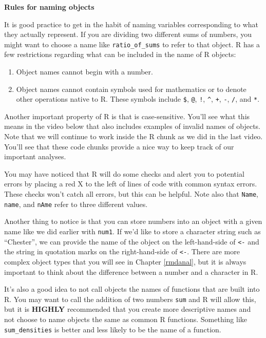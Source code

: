 \documentclass[]{tufte-book}
\providecommand{\tightlist}{%
  \setlength{\itemsep}{0pt}\setlength{\parskip}{0pt}}
\begin{document}
\vspace*{0.2in}

\noindent\textbf{Rules for naming objects}\vspace*{0.1in}

It is good practice to get in the habit of naming variables corresponding to what they actually represent. If you are dividing two different sums of numbers, you might want to choose a name like \texttt{ratio\_of\_sums} to refer to that object. R has a few restrictions regarding what can be included in the name of R objects:

\begin{enumerate}
\def\labelenumi{\arabic{enumi}.}
\tightlist
\item
  Object names cannot begin with a number.
\item
  Object names cannot contain symbols used for mathematics or to denote other operations native to R. These symbols include \texttt{\$}, \texttt{@}, \texttt{!}, \texttt{\^{}}, \texttt{+}, \texttt{-}, \texttt{/}, and \texttt{*}.
\end{enumerate}

Another important property of R is that is case-sensitive. You'll see what this means in the video below that also includes examples of invalid names of objects. Note that we will continue to work inside the R chunk as we did in the last video. You'll see that these code chunks provide a nice way to keep track of our important analyses.

You may have noticed that R will do some checks and alert you to potential errors by placing a red X to the left of lines of code with common syntax errors. These checks won't catch all errors, but this can be helpful. Note also that \texttt{Name}, \texttt{name}, and \texttt{nAme} refer to three different values.

Another thing to notice is that you can store numbers into an object with a given name like we did earlier with \texttt{num1}. If we'd like to store a character string such as ``Chester'', we can provide the name of the object on the left-hand-side of \texttt{\textless{}-} and the string in quotation marks on the right-hand-side of \texttt{\textless{}-}. There are more complex object types that you will see in Chapter \ref{rmdanal}, but it is always important to think about the difference between a number and a character in R.

It's also a good idea to not call objects the names of functions that are built into R. You may want to call the addition of two numbers \texttt{sum} and R will allow this, but it is \textbf{HIGHLY} recommended that you create more descriptive names and not choose to name objects the same as common R functions. Something like \texttt{sum\_densities} is better and less likely to be the name of a function.
\end{document}
